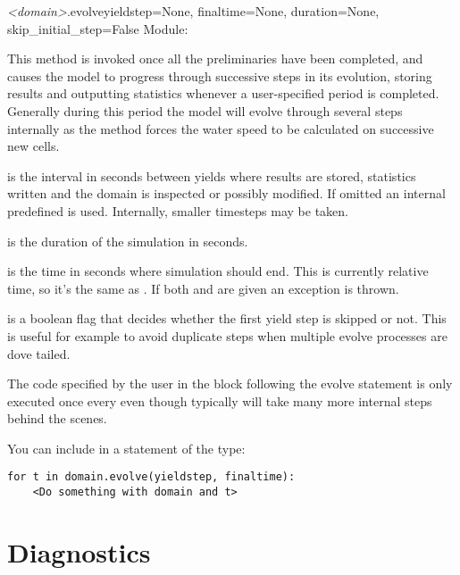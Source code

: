 \documentclass{manual}
\begin{document}
\begin{methoddesc}{\emph{<domain>}.evolve}{yieldstep=None,
                                           finaltime=None,
                                           duration=None,
                                           skip_initial_step=False}
Module: 

This method is invoked once all the
preliminaries have been completed, and causes the model to progress
through successive steps in its evolution, storing results and
outputting statistics whenever a user-specified period
 is completed.  Generally during this period the
model will evolve through several steps internally
as the method forces the water speed to be calculated
on successive new cells.

 is the interval in seconds between yields where results are
stored, statistics written and the domain is inspected or possibly modified.
If omitted an internal predefined  is used.  Internally, smaller
timesteps may be taken.

 is the duration of the simulation in seconds.

 is the time in seconds where simulation should end. This is currently
relative time, so it's the same as .  If both  and
 are given an exception is thrown.

 is a boolean flag that decides whether the first
yield step is skipped or not. This is useful for example to avoid
duplicate steps when multiple evolve processes are dove tailed.

The code specified by the user in the block following the evolve statement is
only executed once every  even though
\anuga typically will take many more internal steps behind the scenes.

You can include  in a statement of the type:

\begin{verbatim}
for t in domain.evolve(yieldstep, finaltime):
    <Do something with domain and t>
\end{verbatim}
\end{methoddesc}

\section{Diagnostics}
\label{sec:diagnostics}
\end{document}
